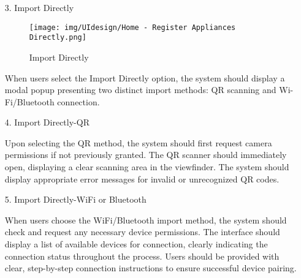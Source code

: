 \documentclass[conference]{IEEEtran}
\begin{document}
\begin{enumerate}
\begin{itemize}
\begin{itemize}
\begin{enumerate}
\begin{enumerate}
    \item[3.] Import Directly
    \begin{figure}[h]
        {\centering
        \hspace{4cm}
        \begin{minipage}{0.4\columnwidth}
            \texttt{[image: img/UIdesign/Home - Register Appliances Directly.png]}
            \caption{Import Directly}
        \end{minipage}}
    \end{figure}
    
    When users select the Import Directly option, the system should display a modal popup presenting two distinct import methods: QR scanning and Wi-Fi/Bluetooth connection. \\ 
\end{enumerate}

\begin{enumerate}
    \item[4.] Import Directly-QR
    
    Upon selecting the QR method, the system should first request camera permissions if not previously granted. The QR scanner should immediately open, displaying a clear scanning area in the viewfinder. The system should display appropriate error messages for invalid or unrecognized QR codes. \\ 
\end{enumerate}

\begin{enumerate}
    \item[5.] Import Directly-WiFi or Bluetooth
    
    When users choose the WiFi/Bluetooth import method, the system should check and request any necessary device permissions. The interface should display a list of available devices for connection, clearly indicating the connection status throughout the process. Users should be provided with clear, step-by-step connection instructions to ensure successful device pairing.
\end{enumerate}

\clearpage


\end{enumerate}
\end{itemize}
\end{itemize}
\end{enumerate}
\end{document}
